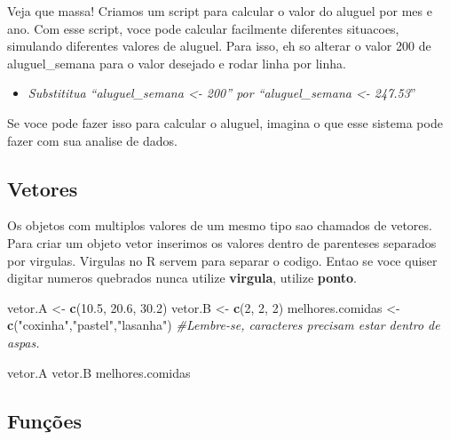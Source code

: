 \documentclass[
]{book}
\newenvironment{Shaded}{\begin{snugshade}}{\end{snugshade}}
\newcommand{\CommentTok}[1]{\textcolor[rgb]{0.56,0.35,0.01}{\textit{#1}}}
\newcommand{\DecValTok}[1]{\textcolor[rgb]{0.00,0.00,0.81}{#1}}
\newcommand{\FloatTok}[1]{\textcolor[rgb]{0.00,0.00,0.81}{#1}}
\newcommand{\FunctionTok}[1]{\textcolor[rgb]{0.13,0.29,0.53}{\textbf{#1}}}
\newcommand{\NormalTok}[1]{#1}
\newcommand{\OtherTok}[1]{\textcolor[rgb]{0.56,0.35,0.01}{#1}}
\newcommand{\StringTok}[1]{\textcolor[rgb]{0.31,0.60,0.02}{#1}}
\providecommand{\tightlist}{%
  \setlength{\itemsep}{0pt}\setlength{\parskip}{0pt}}
\begin{document}
Veja que massa! Criamos um script para calcular o valor do aluguel por mes e ano. Com esse script, voce pode calcular facilmente diferentes situacoes, simulando diferentes valores de aluguel. Para isso, eh so alterar o valor 200 de aluguel\_semana para o valor desejado e rodar linha por linha.

\begin{itemize}
\tightlist
\item
  \emph{Substititua ``aluguel\_semana \textless- 200'' por ``aluguel\_semana \textless- 247.53}''
\end{itemize}

Se voce pode fazer isso para calcular o aluguel, imagina o que esse sistema pode fazer com sua analise de dados.

\hypertarget{vetores}{%
\subsection{Vetores}\label{vetores}}

Os objetos com multiplos valores de um mesmo tipo sao chamados de vetores. Para criar um objeto vetor inserimos os valores dentro de parenteses separados por virgulas. Virgulas no R servem para separar o codigo. Entao se voce quiser digitar numeros quebrados nunca utilize \textbf{virgula}, utilize \textbf{ponto}.

\begin{Shaded}
\begin{Highlighting}[]
\NormalTok{vetor.A }\OtherTok{\textless{}{-}} \FunctionTok{c}\NormalTok{(}\FloatTok{10.5}\NormalTok{, }\FloatTok{20.6}\NormalTok{, }\FloatTok{30.2}\NormalTok{)}
\NormalTok{vetor.B }\OtherTok{\textless{}{-}} \FunctionTok{c}\NormalTok{(}\DecValTok{2}\NormalTok{, }\DecValTok{2}\NormalTok{, }\DecValTok{2}\NormalTok{)}
\NormalTok{melhores.comidas }\OtherTok{\textless{}{-}} \FunctionTok{c}\NormalTok{(}\StringTok{"coxinha"}\NormalTok{,}\StringTok{"pastel"}\NormalTok{,}\StringTok{"lasanha"}\NormalTok{) }\CommentTok{\#Lembre{-}se, caracteres precisam estar dentro de aspas.}

\NormalTok{vetor.A}
\NormalTok{vetor.B}
\NormalTok{melhores.comidas}
\end{Highlighting}
\end{Shaded}

\hypertarget{funuxe7uxf5es}{%
\subsection{Funções}\label{funuxe7uxf5es}}
\end{document}
